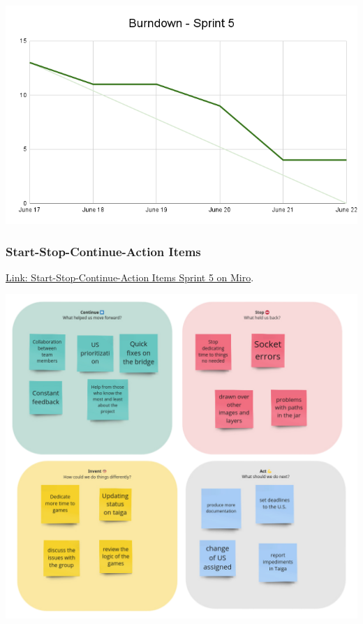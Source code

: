 \includegraphics[width=\textwidth]{./artifacts/src/sprint-5/assets/Burndown-Sprint5.png}

\hypertarget{startstopcontinueactionitems-s3}{
\subsubsection{Start-Stop-Continue-Action Items}\label{Start-Stop-Continue-Action Items S6}}
\href{https://miro.com/app/board/uXjVKDO7l8M=/?moveToWidget=3458764590247999187&cot=14}{Link: Start-Stop-Continue-Action Items Sprint 5 on Miro}.

\includegraphics[width=\textwidth]{./artifacts/src/sprint-5/assets/Retrospectives-Sprint5.png}


